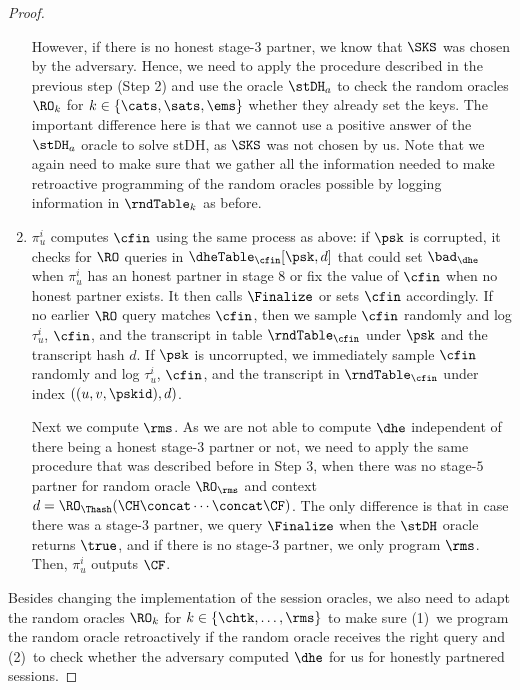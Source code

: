 \begin{proof}
\begin{enumerate}
		However, if there is no honest stage-$3$ partner, we know that $\SKS$ was chosen by the adversary.
		Hence, we need to apply the procedure described in the previous step (Step 2) and use the oracle $\stDH_a$ to check the random oracles $\RO_{k}$ for $k \in \{\cats, \sats, \ems\}$ whether they already set the keys.
		The important difference here is that we cannot use a positive answer of the $\stDH_a$ oracle to solve stDH,
		as $\SKS$ was not chosen by us.
		Note that we again need to make sure that we gather all the information needed to make retroactive programming of the random oracles possible by logging information in $\rndTable_{k}$ as before.
%		
		\item $\pi_u^i$ computes $\cfin$ using the same process as above: if $\psk$ is corrupted, it checks for $\RO$ queries in $\dheTable_{\cfin}[\psk, d]$ that could set $\bad_{\dhe}$ when $\pi_u^i$ has an honest partner in stage $8$ or fix the value of $\cfin$ when no honest partner exists.
		It then calls $\Finalize$ or sets $\cfin$ accordingly.
		If no earlier $\RO$ query matches $\cfin$, then we sample $\cfin$ randomly and log $\tau_u^i$, $\cfin$, and the transcript in table $\rndTable_{\cfin}$ under $\psk$ and the transcript hash $d$.
		If $\psk$ is uncorrupted, we immediately sample $\cfin$ randomly and log $\tau_u^i$, $\cfin$, and the transcript in $\rndTable_{\cfin}$ under index $((u,v,\pskid), d)$.
		
		Next we compute $\rms$.
		As we are not able to compute $\dhe$ independent of there being a honest stage-$3$ partner or not, we need to apply the same procedure that was described before in Step 3, when there was no stage-$5$ partner for random oracle $\RO_\rms$ and context $d = \RO_\Thash(\CH \concat \dotsb \concat \CF)$.
		The only difference is that in case there was a stage-$3$ partner, we query $\Finalize$ when the $\stDH$ oracle returns $\true$, and if there is no stage-$3$ partner, we only program $\rms$.
		Then, $\pi_u^i$ outputs $\CF$.
	\end{enumerate}
	
	Besides changing the implementation of the session oracles, we also need to adapt the random oracles $\RO_k$ for $k \in \{\chtk, \dotsc,\rms\}$ to make sure
	(1)~we program the random oracle retroactively if the random oracle receives the right query and
	(2)~to check whether the adversary computed $\dhe$ for us for honestly partnered sessions.
	

\end{proof}
